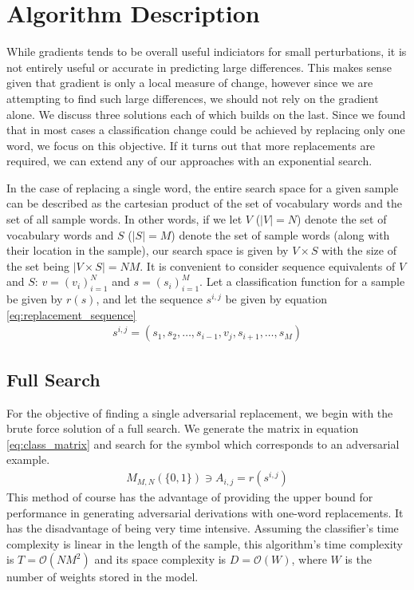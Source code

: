 \chapter{Algorithm Description}
While gradients tends to be overall useful indiciators for small perturbations, it is not entirely useful or accurate in predicting large differences.  This makes sense given that gradient is only a local measure of change, however since we are attempting to find such large differences, we should not rely on the gradient alone.  We discuss three solutions each of which builds on the last.  Since we found that in most cases a classification change could be achieved by replacing only one word, we focus on this objective.  If it turns out that more replacements are required, we can extend any of our approaches with an exponential search.

In the case of replacing a single word, the entire search space for a given sample can be described as the cartesian product of the set of vocabulary words and the set of all sample words.  In other words, if we let $V$ ($|V| = N$) denote the set of vocabulary words and $S$ ($|S| = M$) denote the set of sample words (along with their location in the sample), our search space is given by $V\times S$ with the size of the set being $|V\times S| = NM$.  It is convenient to consider sequence equivalents of $V$ and $S$: $v = (v_i)_{i=1}^N$ and $s = (s_i)_{i=1}^M$.  Let a classification function for a sample be given by $r(s)$, and let the sequence $s^{i,j}$ be given by equation \ref{eq:replacement_sequence}
\begin{align}\label{eq:replacement_sequence}
s^{i,j} = (s_1,s_2,\dots,s_{i-1},v_j,s_{i+1},\dots,s_M)
\end{align}

\section{Full Search}
For the objective of finding a single adversarial replacement, we begin with the brute force solution of a full search.  We generate the matrix in equation \ref{eq:class_matrix} and search for the symbol which corresponds to an adversarial example.
\begin{align}\label{eq:class_matrix}
M_{M,N}(\{0,1\}) \ni A_{i,j} = r(s^{i,j})
\end{align}
This method of course has the advantage of providing the upper bound for performance in generating adversarial derivations with one-word replacements.  It has the disadvantage of being very time intensive.  Assuming the classifier's time complexity is linear in the length of the sample, this algorithm's time complexity is $T=\mathcal{O}(NM^2)$ and its space complexity is $D=\mathcal{O}(W)$, where $W$ is the number of weights stored in the model.

